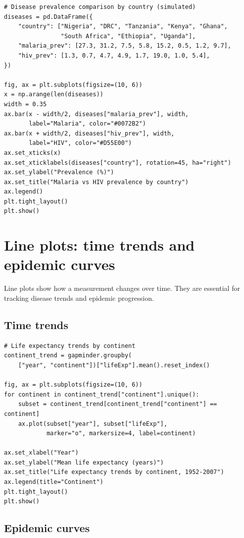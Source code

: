 \begin{verbatim}
# Disease prevalence comparison by country (simulated)
diseases = pd.DataFrame({
    "country": ["Nigeria", "DRC", "Tanzania", "Kenya", "Ghana",
                "South Africa", "Ethiopia", "Uganda"],
    "malaria_prev": [27.3, 31.2, 7.5, 5.8, 15.2, 0.5, 1.2, 9.7],
    "hiv_prev": [1.3, 0.7, 4.7, 4.9, 1.7, 19.0, 1.0, 5.4],
})

fig, ax = plt.subplots(figsize=(10, 6))
x = np.arange(len(diseases))
width = 0.35
ax.bar(x - width/2, diseases["malaria_prev"], width,
       label="Malaria", color="#0072B2")
ax.bar(x + width/2, diseases["hiv_prev"], width,
       label="HIV", color="#D55E00")
ax.set_xticks(x)
ax.set_xticklabels(diseases["country"], rotation=45, ha="right")
ax.set_ylabel("Prevalence (%)")
ax.set_title("Malaria vs HIV prevalence by country")
ax.legend()
plt.tight_layout()
plt.show()
\end{verbatim}

\section{Line plots: time trends and epidemic curves}

Line plots show how a measurement changes over time. They are essential for tracking disease trends and epidemic progression.

\subsection{Time trends}

\begin{verbatim}
# Life expectancy trends by continent
continent_trend = gapminder.groupby(
    ["year", "continent"])["lifeExp"].mean().reset_index()

fig, ax = plt.subplots(figsize=(10, 6))
for continent in continent_trend["continent"].unique():
    subset = continent_trend[continent_trend["continent"] == continent]
    ax.plot(subset["year"], subset["lifeExp"],
            marker="o", markersize=4, label=continent)

ax.set_xlabel("Year")
ax.set_ylabel("Mean life expectancy (years)")
ax.set_title("Life expectancy trends by continent, 1952-2007")
ax.legend(title="Continent")
plt.tight_layout()
plt.show()
\end{verbatim}

\subsection{Epidemic curves}

